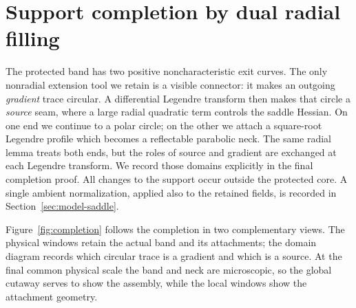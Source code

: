 \documentclass[11pt]{amsart}
\theoremstyle{definition}
\theoremstyle{remark}
\numberwithin{equation}{section}
\begin{document}
\section{Support completion by dual radial filling}\label{sec:completion}
The protected band has two positive noncharacteristic exit curves.
The only nonradial extension tool we retain is a visible connector: it
makes an outgoing \emph{gradient} trace circular. A differential Legendre
transform then makes that circle a \emph{source} seam, where a large
radial quadratic term controls the saddle Hessian. On one end we continue
to a polar circle; on the other we attach a square-root Legendre profile
which becomes a reflectable parabolic neck. The same radial lemma treats
both ends, but the roles of source and gradient are exchanged at each
Legendre transform. We record those domains explicitly in the final
completion proof. All changes to the support occur outside the
protected core. A single ambient normalization, applied also to the
retained fields, is recorded in Section~\ref{sec:model-saddle}.


Figure~\ref{fig:completion} follows the completion in two complementary
views. The physical windows retain the actual band and its attachments;
the domain diagram records which circular trace is a gradient and which
is a source. At the final common physical scale the band and neck are
microscopic, so the global cutaway serves to show the assembly, while
the local windows show the attachment geometry.
\end{document}
